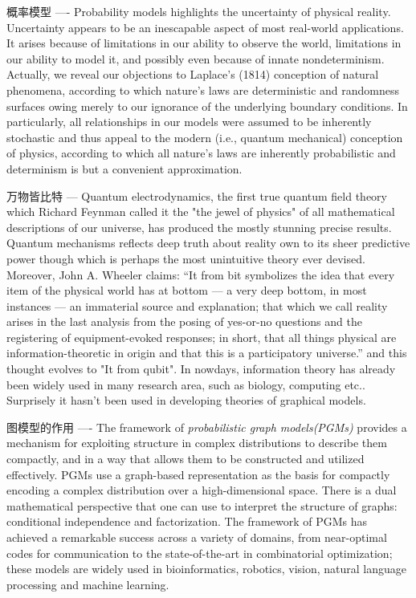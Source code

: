 \documentclass{article}
\theoremstyle{definition}
\theoremstyle{remark}
\theoremstyle{definition}
\begin{document}
\begin{CJK*}{UTF8}{gbsn}
概率模型 ----
Probability models highlights the uncertainty
of physical reality. Uncertainty appears to be an inescapable aspect of most real-world applications. It arises because of limitations in our ability to observe the world, limitations in our ability to model it, and possibly even because of innate nondeterminism. Actually, we reveal our objections to Laplace’s (1814) conception of natural phenomena, according to which nature’s laws are deterministic and randomness surfaces owing merely to our ignorance of the underlying boundary conditions. In particularly, all relationships in our models were assumed to be inherently stochastic and thus appeal to the modern (i.e., quantum mechanical) conception of physics, according to which all nature’s laws are inherently probabilistic and determinism is but a convenient approximation.

万物皆比特 ---
Quantum electrodynamics, the first true quantum field theory which Richard Feynman called it the "the jewel of physics" of all mathematical descriptions of our universe, has produced the mostly stunning precise results. Quantum mechanisms reflects deep truth about reality own to its sheer predictive power though which is perhaps the most unintuitive theory ever devised. Moreover, John A. Wheeler claims: “It from bit symbolizes the idea that every item of the physical world has at bottom — a very deep bottom, in most instances — an immaterial source and explanation; that which we call reality arises in the last analysis from the posing of yes-or-no questions and the registering of equipment-evoked responses; in short, that all things physical are information-theoretic in origin and that this is a participatory universe\cite{wheeler1990information}.” and this thought evolves to "It from qubit". In nowdays, information theory has already been widely used in many research area, such as biology, computing etc.. Surprisely it hasn't been used in developing theories of graphical models.   



图模型的作用 ----
The framework of \emph{probabilistic graph models(PGMs)} provides a mechanism for exploiting structure in complex distributions to describe them compactly, and in a way that allows them to be constructed and utilized effectively. PGMs use a graph-based representation as the basis for compactly encoding a complex distribution over a high-dimensional space. There is a dual mathematical perspective that one can use to interpret the structure of graphs: conditional independence and factorization\cite{koller2009probabilistic}. The framework of PGMs has achieved a remarkable success across a variety of domains, from near-optimal codes for communication to the state-of-the-art in combinatorial optimization; these models are widely used in bioinformatics, robotics, vision, natural language processing and machine learning.


\end{CJK*}
\end{document}
